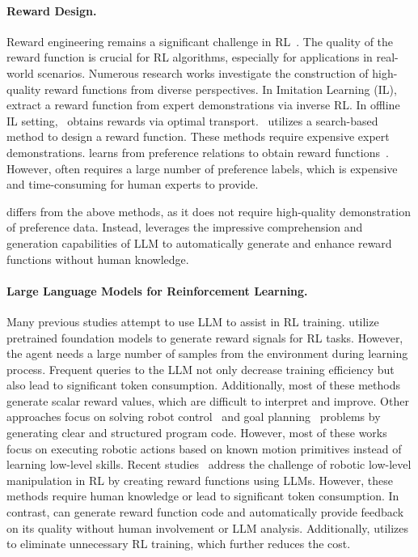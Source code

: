 \documentclass{article}
\theoremstyle{plain}
\theoremstyle{definition}
\theoremstyle{remark}
\begin{document}
\paragraph{Reward Design.}
Reward engineering remains a significant challenge in RL~\cite{laud2004theory,singh2009rewards,sutton2018reinforcement,gupta2022unpacking}.
The quality of the reward function is crucial for RL algorithms, especially for applications in real-world scenarios. Numerous research works investigate the construction of high-quality reward functions from diverse perspectives. In Imitation Learning (IL),~\cite{ziebart2008maximum,wulfmeier2015maximum,finn2016guided,GAIL,AIRL} extract a reward function from expert demonstrations via inverse RL.
In offline IL setting,~\cite{OTR} obtains rewards via optimal transport.~\cite{SEABO} utilizes a search-based method to design a reward function. These methods require expensive expert demonstrations. \PbRL learns from preference relations to obtain reward functions~\cite{christiano2017deep,ibarz2018reward,PEBBLE,Meta-Reward-Net,PEARL}. However, \pbRL often requires a large number of preference labels, which is expensive and time-consuming for human experts to provide.

\ourmethod differs from the above methods, as it does not require high-quality demonstration of preference data. Instead, \ourmethod leverages the impressive comprehension and generation capabilities of LLM to automatically generate and enhance reward functions without human knowledge.


\paragraph{Large Language Models for Reinforcement Learning.}
Many previous studies attempt to use LLM to assist in RL training. \cite{ma2022vip,fan2022minedojo,ma2023liv,du2023vision,karamcheti2023language,ELLM,kwon2023reward} utilize pretrained foundation models to generate reward signals for RL tasks. However, the agent needs a large number of samples from the environment during learning process. Frequent queries to the LLM not only decrease training efficiency but also lead to significant token consumption. Additionally, most of these methods generate scalar reward values, which are difficult to interpret and improve. Other approaches focus on solving robot control~\cite{liang2023code,huang2023instruct2act,wang2023demo2code} and goal planning~\cite{lin2023text2motion,ding2023task,xie2023translating,liu2023llm+,singh2023progprompt,wang2023voyager,silver2024generalized} problems by generating clear and structured program code. However, most of these works focus on executing robotic actions based on known motion primitives instead of learning low-level skills. Recent studies~\cite{L2R,Text2Reward,Eureka,li2024auto} address the challenge of robotic low-level manipulation in RL by creating reward functions using LLMs. However, these methods require human knowledge or lead to significant token consumption. In contrast, \ourmethod can generate reward function code and automatically provide feedback on its quality without human involvement or LLM analysis. Additionally, \ourmethod utilizes \TPE to eliminate unnecessary RL training, which further reduces the cost.
\end{document}
